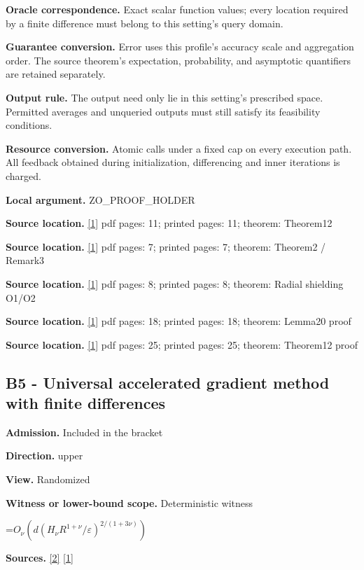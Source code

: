 \documentclass[10pt,a4paper]{article}
\newcommand{\AtlasMath}[1]{\par\begingroup\centering\setbox0=\hbox{$\displaystyle #1$}\ifdim\wd0>1.4\linewidth\typeout{ATLAS WIDE FORMULA: \the\wd0}\fi\ifdim\wd0>\linewidth\resizebox{\linewidth}{!}{\box0}\else\box0\fi\par\endgroup}
\begin{document}
\textbf{Oracle correspondence.} Exact scalar function values; every location required by a finite difference must belong to this setting's query domain.

\textbf{Guarantee conversion.} Error uses this profile's accuracy scale and aggregation order. The source theorem's expectation, probability, and asymptotic quantifiers are retained separately.

\textbf{Output rule.} The output need only lie in this setting's prescribed space. Permitted averages and unqueried outputs must still satisfy its feasibility conditions.

\textbf{Resource conversion.} Atomic calls under a fixed cap on every execution path. All feedback obtained during initialization, differencing and inner iterations is charged.

\textbf{Local argument.} ZO\_\allowbreak{}PROOF\_\allowbreak{}HOLDER

\textbf{Source location.} \href{https://proceedings.mlr.press/v99/diakonikolas19c/diakonikolas19c.pdf}{[1]} pdf pages: 11; printed pages: 11; theorem: Theorem12

\textbf{Source location.} \href{https://proceedings.mlr.press/v99/diakonikolas19c/diakonikolas19c.pdf}{[1]} pdf pages: 7; printed pages: 7; theorem: Theorem2 / Remark3

\textbf{Source location.} \href{https://proceedings.mlr.press/v99/diakonikolas19c/diakonikolas19c.pdf}{[1]} pdf pages: 8; printed pages: 8; theorem: Radial shielding O1/O2

\textbf{Source location.} \href{https://proceedings.mlr.press/v99/diakonikolas19c/diakonikolas19c.pdf}{[1]} pdf pages: 18; printed pages: 18; theorem: Lemma20 proof

\textbf{Source location.} \href{https://proceedings.mlr.press/v99/diakonikolas19c/diakonikolas19c.pdf}{[1]} pdf pages: 25; printed pages: 25; theorem: Theorem12 proof

\subsection{B5 - Universal accelerated gradient method with finite differences}
\textbf{Admission.} Included in the bracket

\textbf{Direction.} upper

\textbf{View.} Randomized

\textbf{Witness or lower-bound scope.} Deterministic witness

\AtlasMath{O_\nu\!\left(d(H_\nu R^{1+\nu}/\varepsilon)^{2/(1+3\nu)}\right)}
\textbf{Sources.} \href{https://optimization-online.org/wp-content/uploads/2013/04/3833.pdf}{[2]} \href{https://proceedings.mlr.press/v99/diakonikolas19c/diakonikolas19c.pdf}{[1]}
\end{document}
